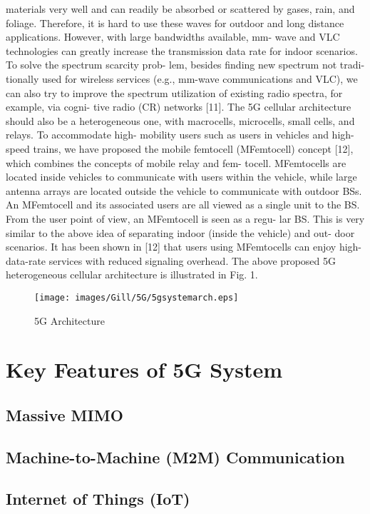 materials very well and can readily be absorbed or scattered by gases, rain, and foliage. Therefore, it is hard to use these waves for outdoor and long distance applications. However, with large bandwidths available, mm- wave and VLC technologies can greatly increase the transmission data rate for indoor scenarios. To solve the spectrum scarcity prob- lem, besides finding new spectrum not tradi- tionally used for wireless services (e.g., mm-wave communications and VLC), we can also try to improve the spectrum utilization of existing radio spectra, for example, via cogni- tive radio (CR) networks [11].
The 5G cellular architecture should also be a heterogeneous one, with macrocells, microcells, small cells, and relays. To accommodate high- mobility users such as users in vehicles and high- speed trains, we have proposed the mobile femtocell (MFemtocell) concept [12], which combines the concepts of mobile relay and fem- tocell. MFemtocells are located inside vehicles to communicate with users within the vehicle, while large antenna arrays are located outside the vehicle to communicate with outdoor BSs. An MFemtocell and its associated users are all viewed as a single unit to the BS. From the user point of view, an MFemtocell is seen as a regu- lar BS. This is very similar to the above idea of separating indoor (inside the vehicle) and out- door scenarios. It has been shown in [12] that users using MFemtocells can enjoy high-data-rate services with reduced signaling overhead. The above proposed 5G heterogeneous cellular architecture is illustrated in Fig. 1.



\begin{figure}
\centering
\texttt{[image: images/Gill/5G/5gsystemarch.eps]}
\caption{5G Architecture}
\end{figure}

\section{Key Features of 5G System}
\subsection{Massive MIMO}
\subsection{Machine-to-Machine (M2M) Communication}
\subsection{Internet of Things (IoT)}

